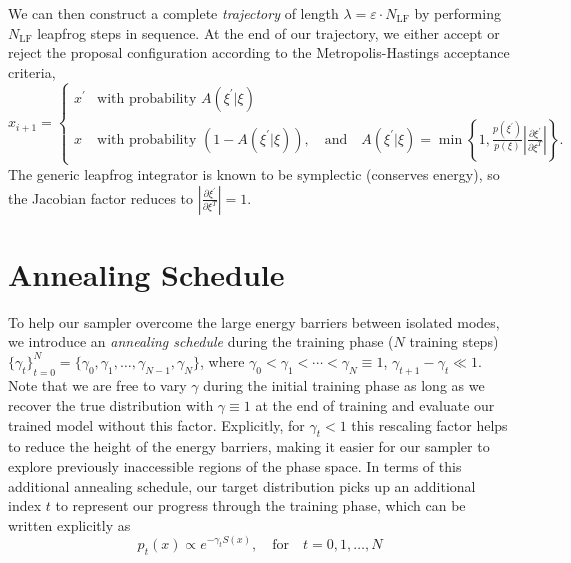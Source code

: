 \documentclass{article} %
\begin{document}
%
We can then construct a complete \emph{trajectory} of length \(\lambda = \varepsilon\cdot N_{\mathrm{LF}}\) by
performing \(N_{\mathrm{LF}}\) leapfrog steps in sequence.
%
At the end of our trajectory, we either accept or reject the proposal configuration according to the Metropolis-Hastings
acceptance criteria,
%
\begin{equation}
   x_{i+1} =
   \begin{cases}%
      x^{\prime} &\mbox{with probability } A(\xi^{\prime}|\xi) \\
      x &\mbox{with probability } (1 - A(\xi^{\prime}|\xi)), \quad\text{and}\quad%
         A(\xi^{\prime}|\xi) = \min\left\{%
            1, \frac{p(\xi^{\prime})}{p(\xi)}\left|\frac{\partial{\xi^{\prime}}}{\partial\xi^{T}}\right|%
         \right\}.
   \end{cases}
   \label{eq:mhcriteria}
\end{equation}
%
The generic leapfrog integrator is known to be symplectic (conserves energy), so the Jacobian factor reduces to
\(\left|\frac{\partial\xi^{\prime}}{\partial\xi^{T}}\right| = 1\). 
%
\section{\label{sec:annealing}Annealing Schedule}
%
To help our sampler overcome the large energy barriers between isolated modes, we introduce an \emph{annealing schedule}
during the training phase (\(N\) training steps) \({\{\gamma_{t}\}}_{t=0}^{N} = \{\gamma_{0}, \gamma_{1}, \ldots,
\gamma_{N-1}, \gamma_{N}\}\), where \(\gamma_{0} < \gamma_{1} < \cdots < \gamma_{N} \equiv 1\), \(\gamma_{t+1} -
\gamma_{t} \ll 1\).
%
Note that we are free to vary \(\gamma\) during the initial training phase as long as we recover the true distribution
with \(\gamma \equiv 1\) at the end of training and evaluate our trained model without this factor.
%
Explicitly, for \(\gamma_{t} < 1\) this rescaling factor helps to reduce the height of the energy barriers, making it
easier for our sampler to explore previously inaccessible regions of the phase space.
%
In terms of this additional annealing schedule, our target distribution picks up an additional index \(t\) to represent
our progress through the training phase, which can be written explicitly as %
\begin{equation}
   p_{t}(x)\propto e^{-\gamma_{t} S(x)},\quad\text{for}\quad t=0, 1, \ldots, N
   \label{eq:targetannealing}
\end{equation}
%
\end{document}
